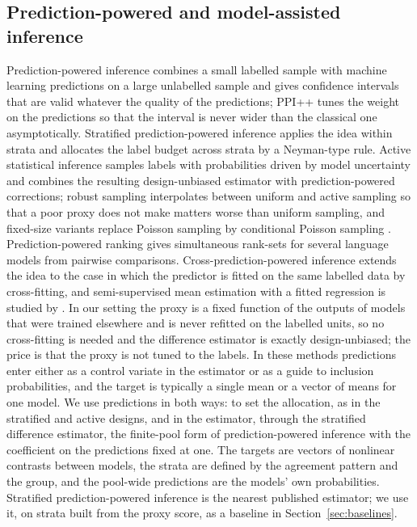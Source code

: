 \documentclass[pdflatex,sn-mathphys-num,iicol]{sn-jnl}
\theoremstyle{thmstyleone}
\theoremstyle{thmstyletwo}
\theoremstyle{thmstylethree}
\begin{document}
\subsection{Prediction-powered and model-assisted inference}

Prediction-powered inference \citep{angelopoulos2023ppi} combines a small labelled sample with machine learning predictions on a large unlabelled sample and gives confidence intervals that are valid whatever the quality of the predictions; PPI++ \citep{angelopoulos2026ppipp} tunes the weight on the predictions so that the interval is never wider than the classical one asymptotically. Stratified prediction-powered inference \citep{fisch2024stratppi} applies the idea within strata and allocates the label budget across strata by a Neyman-type rule. Active statistical inference \citep{zrnic2024active} samples labels with probabilities driven by model uncertainty and combines the resulting design-unbiased estimator with prediction-powered corrections; robust sampling \citep{li2025robust} interpolates between uniform and active sampling so that a poor proxy does not make matters worse than uniform sampling, and fixed-size variants replace Poisson sampling by conditional Poisson sampling \citep{skalnes2026}. Prediction-powered ranking \citep{chatzi2024} gives simultaneous rank-sets for several language models from pairwise comparisons. Cross-prediction-powered inference \citep{zrnic2024cross} extends the idea to the case in which the predictor is fitted on the same labelled data by cross-fitting, and semi-supervised mean estimation with a fitted regression is studied by \citet{zhang2019semisupervised}. In our setting the proxy is a fixed function of the outputs of models that were trained elsewhere and is never refitted on the labelled units, so no cross-fitting is needed and the difference estimator is exactly design-unbiased; the price is that the proxy is not tuned to the labels. In these methods predictions enter either as a control variate in the estimator or as a guide to inclusion probabilities, and the target is typically a single mean or a vector of means for one model. We use predictions in both ways: to set the allocation, as in the stratified and active designs, and in the estimator, through the stratified difference estimator, the finite-pool form of prediction-powered inference with the coefficient on the predictions fixed at one. The targets are vectors of nonlinear contrasts between models, the strata are defined by the agreement pattern and the group, and the pool-wide predictions are the models' own probabilities. Stratified prediction-powered inference is the nearest published estimator; we use it, on strata built from the proxy score, as a baseline in Section~\ref{sec:baselines}.
\end{document}
